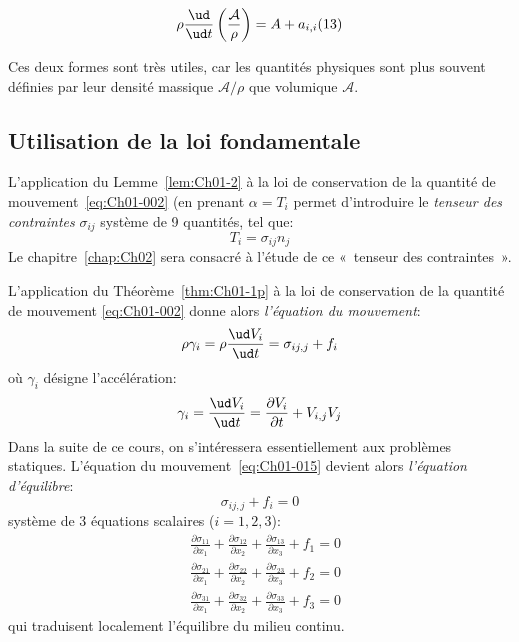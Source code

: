 \begin{thm}
    \begin{equation}
        \rho\frac{\ud}{\ud t}\left(\frac{\mathcal{A}}{\rho}\right)=A+a_{i,i}(13)
        \label{eq:Ch01-013}
    \end{equation}
    \label{thm:Ch01-1p}
\end{thm}
Ces deux formes sont très utiles, car les quantités physiques sont plus souvent définies par leur densité massique $\mathcal{A}/\rho$ que volumique $\mathcal{A}$.
\subsection{Utilisation de la loi fondamentale} \label{ssec:Ch01-1.3}
L'application du Lemme~\ref{lem:Ch01-2} à la loi de conservation de la quantité de mouvement~\eqref{eq:Ch01-002} (en prenant $\alpha=T_i$ permet d'introduire le \emph{tenseur des contraintes} $\sigma_{ij}$
système de 9 quantités, tel que:
\begin{equation}
    T_i=\sigma_{ij}n_j
    \label{eq:Ch01-014}
\end{equation}
Le chapitre~\ref{chap:Ch02} sera consacré à l'étude de ce «~tenseur des contraintes~».

L'application du Théorème~\ref{thm:Ch01-1p} à la loi de conservation de la quantité de mouvement \eqref{eq:Ch01-002} donne alors \emph{l'équation du mouvement}:
\begin{equation}
    \rho\gamma_i=\rho\frac{\ud V_i}{\ud t}=\sigma_{ij,j}+f_i
    \label{eq:Ch01-015}
\end{equation}
où $\gamma_i$ désigne l'accélération:
\begin{equation}
    \gamma_i=\frac{\ud V_i}{\ud t}=\frac{\partial V_i}{\partial t}+V_{i,j}V_j
    \label{eq:Ch01-016}
\end{equation}
Dans la suite de ce cours, on s'intéressera essentiellement aux problèmes statiques.
L'équation du mouvement~\eqref{eq:Ch01-015} devient alors \emph{l'équation d'équilibre}:
\begin{equation}
    \sigma_{ij,j}+f_i=0
    \label{eq:Ch01-017}
\end{equation}
système de 3 équations scalaires ($i=1,2,3$):
\begin{equation}
    \begin{aligned}
        &\frac{\partial \sigma_{11}}{\partial x_1}+\frac{\partial \sigma_{12}}{\partial x_2}+\frac{\partial \sigma_{13}}{\partial x_3}+f_1=0\\
        &\frac{\partial \sigma_{21}}{\partial x_1}+\frac{\partial \sigma_{22}}{\partial x_2}+\frac{\partial \sigma_{23}}{\partial x_3}+f_2=0\\
        &\frac{\partial \sigma_{31}}{\partial x_1}+\frac{\partial \sigma_{32}}{\partial x_2}+\frac{\partial \sigma_{33}}{\partial x_3}+f_3=0
    \end{aligned}
    \label{eq:Ch01-018}
\end{equation}
qui traduisent localement l'équilibre du milieu continu.

